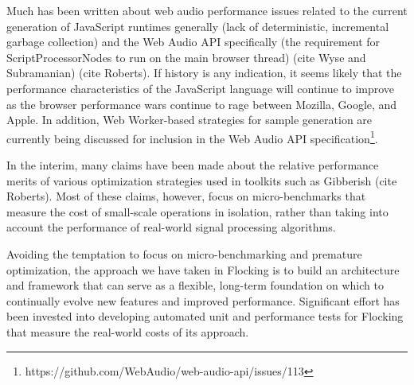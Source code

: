 \documentclass{article}
\begin{document}
Much has been written about web audio performance issues related to the current generation of JavaScript runtimes generally (lack of deterministic, incremental garbage collection) and the Web Audio API specifically (the requirement for ScriptProcessorNodes to run on the main browser thread) (cite Wyse and Subramanian) (cite Roberts). If history is any indication, it seems likely that the performance characteristics of the JavaScript language will continue to improve as the browser performance wars continue to rage between Mozilla, Google, and Apple. In addition, Web Worker-based strategies for sample generation are currently being discussed for inclusion in the Web Audio API specification\footnote{https://github.com/WebAudio/web-audio-api/issues/113}.

In the interim, many claims have been made about the relative performance merits of various optimization strategies used in toolkits such as Gibberish (cite Roberts). Most of these claims, however, focus on micro-benchmarks that measure the cost of small-scale operations in isolation, rather than taking into account the performance of real-world signal processing algorithms.

Avoiding the temptation to focus on micro-benchmarking and premature optimization, the approach we have taken in Flocking is to build an architecture and framework that can serve as a flexible, long-term foundation on which to continually evolve new features and improved performance. Significant effort has been invested into developing automated unit and performance tests for Flocking that measure the real-world costs of its approach.
\end{document}
